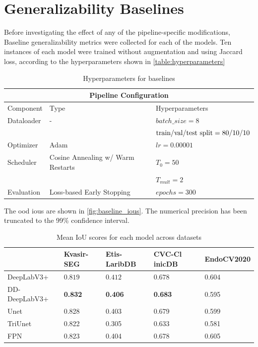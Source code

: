 \section{Generalizability Baselines}
Before investigating the effect of any of the pipeline-specific modifications, Baseline generalizability metrics were collected for each of the models. Ten instances of each model were trained without augmentation and using Jaccard loss, according to the hyperparameters shown in \autoref{table:hyperparameters} \begin{table}[h]
        \centering
        \begin{tabularx}{\linewidth}{llX}
        \toprule
        \multicolumn{3}{c}{\textbf{Pipeline Configuration}}\\
        \toprule
        Component & Type & Hyperparameters \\
        \midrule
        Dataloader & - & \(batch\_size = 8\) \\
        && \(\hbox{train/val/test split} = 80/10/10\)\\
        \midrule
        Optimizer & Adam & \(lr = 0.00001\)\\
        \midrule
        Scheduler & Cosine Annealing w/ Warm Restarts & \(T_0=50\) \\
        & & \(T_{mult}=2\) \\
        \midrule
        Evaluation & Loss-based Early Stopping & \(epochs=300\)\\
        \bottomrule
        \end{tabularx}
            \caption{Hyperparameters for baselines}
            \label{table:hyperparameters}
\end{table}

The \gls{ood} \glspl{iou} are shown in \autoref{fig:baseline_ious}. The numerical precision has been truncated to the 99\% confidence interval. 

\begin{table}[]
    \centering
    \small
    \begin{tabularx}{\linewidth}{@{}lXXXX@{}}
    \toprule
    & Kvasir-SEG & Etis-LaribDB & CVC-Cl    inicDB & EndoCV2020 \\
    \midrule
    DeepLabV3+ & $0.819$ & $0.412 $ & $0.678$ & $\mathbf{0.604}$ \\
    DD-DeepLabV3+ & \textbf{0.832} & \textbf{0.406} & \textbf{0.683} & 0.595 \\
    Unet & 0.828 & 0.403 & 0.679 & 0.599 \\
    TriUnet & 0.822 & 0.305 & 0.633 & 0.581 \\
    FPN& 0.823 & 0.404 &0.678 & 0.605\\
    \bottomrule
    \end{tabularx}
    \caption{Mean IoU scores for each model across datasets}
    \label{tab:baseline_iou}
\end{table}

